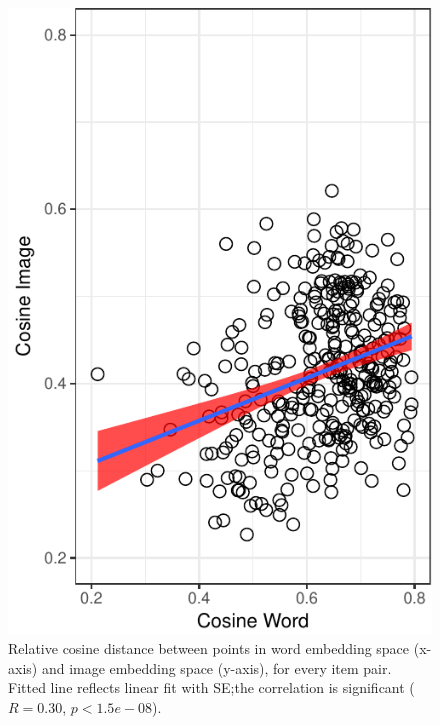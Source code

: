 \documentclass[10pt, letterpaper]{article}
\newenvironment{CodeChunk}{}{}
\begin{document}
\begin{CodeChunk}
\begin{figure}[tb]
\includegraphics{figs/pairwise-corr-1} \caption[Relative cosine distance between points in word embedding space (x-axis) and image embedding space (y-axis), for every item pair]{Relative cosine distance between points in word embedding space (x-axis) and image embedding space (y-axis), for every item pair. Fitted line reflects linear fit with SE;the correlation is significant ($R = 0.30$, $p < 1.5e-08$).}\label{fig:pairwise-corr}
\end{figure}
\end{CodeChunk}
\end{document}
